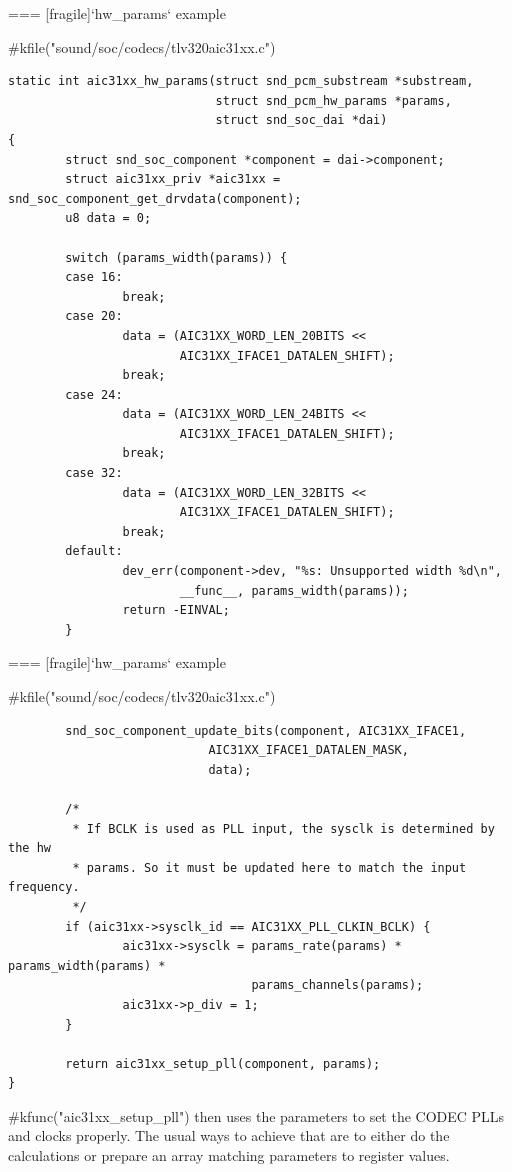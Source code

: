 === [fragile]{`hw_params` example}
  \begin{block}{#kfile("sound/soc/codecs/tlv320aic31xx.c")}
    \fontsize{8}{7}\selectfont
    \begin{verbatim}
static int aic31xx_hw_params(struct snd_pcm_substream *substream,
                             struct snd_pcm_hw_params *params,
                             struct snd_soc_dai *dai)
{
        struct snd_soc_component *component = dai->component;
        struct aic31xx_priv *aic31xx = snd_soc_component_get_drvdata(component);
        u8 data = 0;

        switch (params_width(params)) {
        case 16:
                break;
        case 20:
                data = (AIC31XX_WORD_LEN_20BITS <<
                        AIC31XX_IFACE1_DATALEN_SHIFT);
                break;
        case 24:
                data = (AIC31XX_WORD_LEN_24BITS <<
                        AIC31XX_IFACE1_DATALEN_SHIFT);
                break;
        case 32:
                data = (AIC31XX_WORD_LEN_32BITS <<
                        AIC31XX_IFACE1_DATALEN_SHIFT);
                break;
        default:
                dev_err(component->dev, "%s: Unsupported width %d\n",
                        __func__, params_width(params));
                return -EINVAL;
        }
    \end{verbatim}
  \end{block}


=== [fragile]{`hw_params` example}
  \begin{block}{#kfile("sound/soc/codecs/tlv320aic31xx.c")}
    \fontsize{8}{8}\selectfont
    \begin{verbatim}
        snd_soc_component_update_bits(component, AIC31XX_IFACE1,
                            AIC31XX_IFACE1_DATALEN_MASK,
                            data);

        /*
         * If BCLK is used as PLL input, the sysclk is determined by the hw
         * params. So it must be updated here to match the input frequency.
         */
        if (aic31xx->sysclk_id == AIC31XX_PLL_CLKIN_BCLK) {
                aic31xx->sysclk = params_rate(params) * params_width(params) *
                                  params_channels(params);
                aic31xx->p_div = 1;
        }

        return aic31xx_setup_pll(component, params);
}
    \end{verbatim}
  \end{block}
  #kfunc("aic31xx_setup_pll") then uses the parameters to set the CODEC
  PLLs and clocks properly. The usual ways to achieve that are to
  either do the calculations or prepare an array matching parameters
  to register values.


